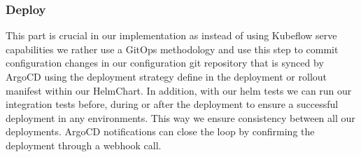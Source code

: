 \subsubsection{Deploy}
This part is crucial in our implementation as instead of using Kubeflow serve capabilities we rather use a GitOps methodology
and use this step to commit configuration changes in our configuration git repository that is synced by ArgoCD
using the deployment strategy define in the deployment or rollout manifest within our HelmChart.
In addition, with our helm tests we can run our integration tests before,
during or after the deployment to ensure a successful deployment in any environments.
This way we ensure consistency between all our deployments. %
ArgoCD notifications can close the loop by confirming the deployment through a webhook call.
